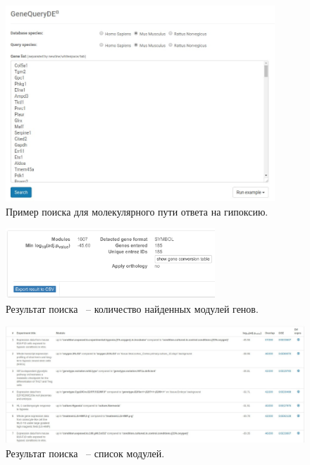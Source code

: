 \documentclass[times,specification,annotation]{itmo-student-thesis}
\begin{document}
\begin{figure}[!h]
    \caption{Пример поиска для молекулярного пути ответа на гипоксию.}\label{clientRequest}
    \centering
    \includegraphics[width=0.9\textwidth]{request.jpg}
\end{figure}

\begin{figure}[!h]
    \caption{Результат поиска ~-- количество найденных модулей генов.}\label{clientResponseShort}
    \centering
    \includegraphics[width=0.7\textwidth]{responseModulesNumber}
\end{figure}

\begin{figure}[!h]
    \caption{Результат поиска ~-- список модулей.}\label{clientResponseTable}
    \centering
    \includegraphics[width=1\textwidth]{responseModulesList.jpg}
\end{figure}
\end{document}
